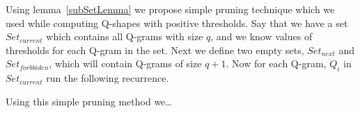 \documentclass[paper=a4, fontsize=11pt]{scrartcl} %
\numberwithin{equation}{section} %
\numberwithin{figure}{section} %
\numberwithin{table}{section} %
\begin{document}
Using lemma~\ref{subSetLemma} we propose simple pruning technique which we used while computing Q-shapes with positive thresholds.
Say that we have a set $Set_{current}$ which contains all Q-grams with size $q$, and we know values of thresholds for each Q-gram in the set. Next we define two empty sets, $Set_{next}$ and $Set_{forbbiden}$, which will contain Q-grams of size $q+1$. Now for each Q-gram, $Q_{i}$ in $Set_{current}$ run the following recurrence.


Using this simple pruning method we\dots


\end{document}
